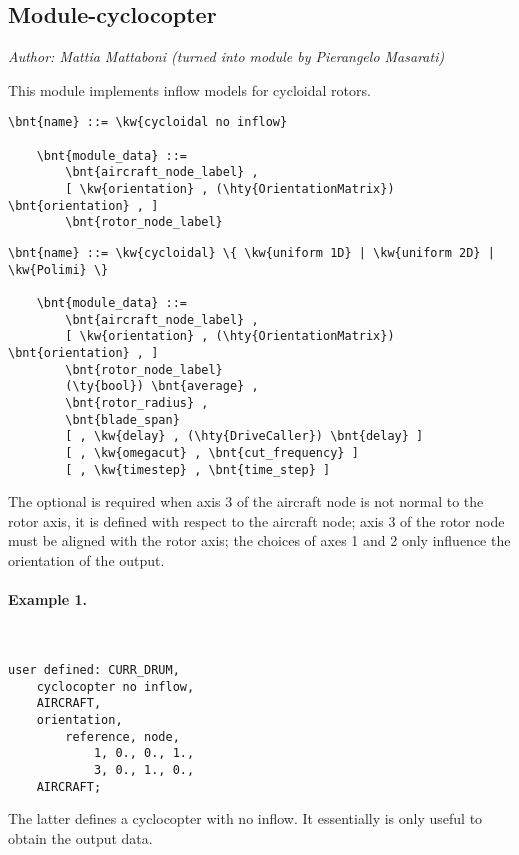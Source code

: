 \subsection{Module-cyclocopter}
\label{sec:MODULES:CYCLOCOPTER}
\emph{Author: Mattia Mattaboni (turned into module by Pierangelo Masarati)}

\noindent
This module implements inflow models for cycloidal rotors.

\begin{Verbatim}[commandchars=\\\{\}]
    \bnt{name} ::= \kw{cycloidal no inflow}

    \bnt{module_data} ::=
        \bnt{aircraft_node_label} ,
        [ \kw{orientation} , (\hty{OrientationMatrix}) \bnt{orientation} , ]
        \bnt{rotor_node_label}
\end{Verbatim}

\begin{Verbatim}[commandchars=\\\{\}]
    \bnt{name} ::= \kw{cycloidal} \{ \kw{uniform 1D} | \kw{uniform 2D} | \kw{Polimi} \}

    \bnt{module_data} ::=
        \bnt{aircraft_node_label} ,
        [ \kw{orientation} , (\hty{OrientationMatrix}) \bnt{orientation} , ]
        \bnt{rotor_node_label}
        (\ty{bool}) \bnt{average} ,
        \bnt{rotor_radius} ,
        \bnt{blade_span}
        [ , \kw{delay} , (\hty{DriveCaller}) \bnt{delay} ]
        [ , \kw{omegacut} , \bnt{cut_frequency} ]
        [ , \kw{timestep} , \bnt{time_step} ]
\end{Verbatim}


The optional  is required when axis 3 
of the aircraft node is not normal to the rotor axis, it is defined with respect to the aircraft node; axis 3
of the rotor node must be aligned with the rotor axis; the choices of axes 1 and 2 only influence the orientation of the output.

\paragraph{Example 1.} \
\begin{verbatim}
user defined: CURR_DRUM,
    cyclocopter no inflow,
    AIRCRAFT,
    orientation,
        reference, node,
            1, 0., 0., 1.,
            3, 0., 1., 0.,
    AIRCRAFT;
\end{verbatim}
The latter defines a cyclocopter with no inflow. It essentially is only useful to obtain the output data.


